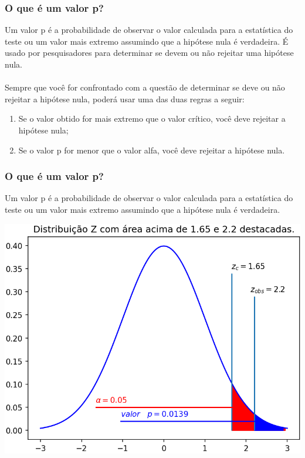 \documentclass[11pt]{beamer}
\begin{document}
\begin{frame}
\frametitle{O que é um valor p?}
Um valor p é a probabilidade de observar o valor calculada para a estatística do teste ou um valor mais extremo assumindo que a hipótese nula é verdadeira. É usado por pesquisadores para determinar se devem ou não rejeitar uma hipótese nula.\\~\\
Sempre que você for confrontado com a questão de determinar se deve ou não rejeitar a hipótese nula, poderá usar uma das duas regras a seguir:

\begin{enumerate}
\item Se o valor obtido for mais extremo que o valor crítico, você deve rejeitar a hipótese nula;
\item Se o valor p for menor que o valor alfa, você deve rejeitar a hipótese nula.
\end{enumerate}

\end{frame}

\begin{frame}
\frametitle{O que é um valor p?}
Um valor p é a probabilidade de observar o valor calculada para a estatística do teste ou um valor mais extremo assumindo que a hipótese nula é verdadeira.

\begin{center}\includegraphics[width=0.6\linewidth]{figs/regiao_critica_valorp.png} \end{center}
\end{frame}
\end{document}
